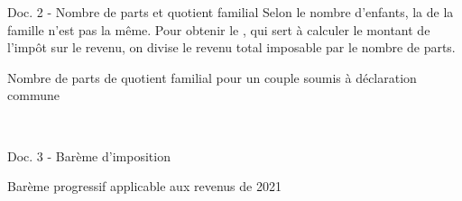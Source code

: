 \documentclass[11pt,a4paper]{article}  %
\begin{document}
\begin{consequences}{Doc. 2 - Nombre de parts et quotient familial}
	Selon le nombre d'enfants, la  de la famille n'est pas la même. Pour obtenir le , qui sert à calculer le montant de l'impôt sur le revenu, on divise le revenu total imposable par le nombre de parts.\\
	\begin{center}
		Nombre de parts de quotient familial pour un couple soumis à déclaration commune\\
	\end{center}
\end{consequences}
\vspace*{-0.2cm}
\ \\
\begin{consequences}{Doc. 3 - Barème d'imposition}
	\begin{center}
		Barème progressif applicable aux revenus de 2021\\
	\end{center}
\end{consequences}
\end{document}
